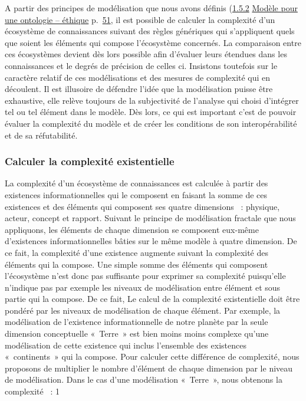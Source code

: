 \documentclass[
  letterpaper,
  DIV=11,
  numbers=noendperiod]{scrreprt}
\begin{document}
A partir des principes de modélisation que nous avons définis
(\protect\hyperlink{anchor-18}{1.5.2}
\protect\hyperlink{anchor-18}{Modèle pour une ontologie -- éthique}
p.~\protect\hyperlink{anchor-18}{51}, il est possible de calculer la
complexité d'un écosystème de connaissances suivant des règles
génériques qui s'appliquent quels que soient les éléments qui compose
l'écosystème concernés. La comparaison entre ces écosystèmes devient dès
lors possible afin d'évaluer leurs étendues dans les connaissances et le
degrés de précision de celles ci. Insistons toutefois sur le caractère
relatif de ces modélisations et des mesures de complexité qui en
découlent. Il est illusoire de défendre l'idée que la modélisation
puisse être exhaustive, elle relève toujours de la subjectivité de
l'analyse qui choisi d'intégrer tel ou tel élément dans le modèle. Dès
lors, ce qui est important c'est de pouvoir évaluer la complexité du
modèle et de créer les conditions de son interopérabilité et de sa
réfutabilité.

\hypertarget{calculer-la-complexituxe9-existentielle}{%
\subsubsection{Calculer la complexité
existentielle}\label{calculer-la-complexituxe9-existentielle}}

La complexité d'un écosystème de connaissances est calculée à partir des
existences informationnelles qui le composent en faisant la somme de ces
existences et des éléments qui composent ses quatre dimensions ~:
physique, acteur, concept et rapport. Suivant le principe de
modélisation fractale que nous appliquons, les éléments de chaque
dimension se composent eux-même d'existences informationnelles bâties
sur le même modèle à quatre dimension. De ce fait, la complexité d'une
existence augmente suivant la complexité des éléments qui la compose.
Une simple somme des éléments qui composent l'écosystème n'est donc pas
suffisante pour exprimer sa complexité puisqu'elle n'indique pas par
exemple les niveaux de modélisation entre élément et sous partie qui la
compose. De ce fait, Le calcul de la complexité existentielle doit être
pondéré par les niveaux de modélisation de chaque élément. Par exemple,
la modélisation de l'existence informationnelle de notre planète par la
seule dimension conceptuelle «~Terre~» est bien moins moins complexe
qu'une modélisation de cette existence qui inclus l'ensemble des
existences «~continents~» qui la compose. Pour calculer cette différence
de complexité, nous proposons de multiplier le nombre d'élément de
chaque dimension par le niveau de modélisation. Dans le cas d'une
modélisation «~Terre~», nous obtenons la complexité ~: 1
\end{document}
